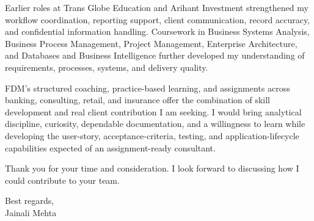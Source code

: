 \documentclass[letterpaper,10pt]{article}
\begin{document}
Earlier roles at Trans Globe Education and Arihant Investment strengthened my workflow coordination, reporting support, client communication, record accuracy, and confidential information handling. Coursework in Business Systems Analysis, Business Process Management, Project Management, Enterprise Architecture, and Databases and Business Intelligence further developed my understanding of requirements, processes, systems, and delivery quality.

FDM's structured coaching, practice-based learning, and assignments across banking, consulting, retail, and insurance offer the combination of skill development and real client contribution I am seeking. I would bring analytical discipline, curiosity, dependable documentation, and a willingness to learn while developing the user-story, acceptance-criteria, testing, and application-lifecycle capabilities expected of an assignment-ready consultant.

Thank you for your time and consideration. I look forward to discussing how I could contribute to your team.

Best regards,\\[8pt]
Jainali Mehta
\end{document}
